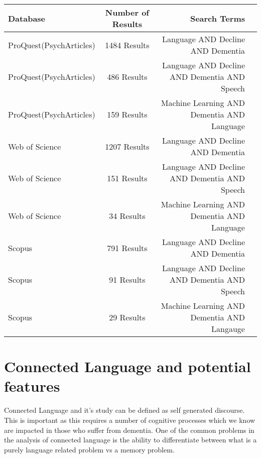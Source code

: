 \documentclass[a4paper]{article}
\begin{document}
\begin{center}
	\begin{tabular}{ | l | c | r | p{1cm} |}
		\hline
		Database & Number of Results & Search Terms  \\ \hline
		ProQuest(PsychArticles) & 1484 Results & Language AND Decline AND Dementia \\ \hline
		ProQuest(PsychArticles) & 486 Results  & Language AND Decline AND Dementia AND Speech \\ \hline
		ProQuest(PsychArticles) & 159 Results & Machine Learning AND Dementia AND Language \\ \hline
		Web of Science & 1207 Results  & Language AND Decline AND Dementia   \\ \hline
		Web of Science & 151 Results  & Language AND Decline AND Dementia AND Speech  \\ \hline
		Web of Science & 34 Results & Machine Learning AND Dementia AND Language \\ \hline
		Scopus & 791 Results & Language AND Decline AND Dementia  \\ \hline
		Scopus & 91 Results & Language AND Decline AND Dementia AND Speech   \\ \hline
		Scopus & 29 Results & Machine Learning AND Dementia AND Langauge \\ \hline
	\end{tabular}
\end{center}

\section{Connected Language and potential features}
Connected Language and it's study can be defined as self generated discourse. This is important as this requires a number of cognitive processes which we know are impacted in those who suffer from dementia. One of the common problems in the analysis of connected language is the ability to differentiate between what is a purely language related problem vs a memory problem. \newline
\par
\end{document}
